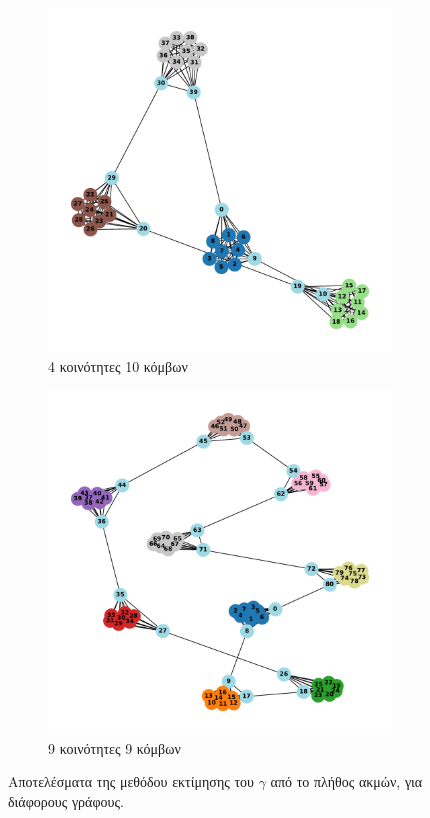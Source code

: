 \documentclass[10pt, letterpaper]{article}
\begin{document}
\begin{figure}
  \begin{subfigure}{0.5\textwidth}
    \centering
    \includegraphics[width=0.8\linewidth]{AUTO4,10.pdf}
    \caption{4 κοινότητες 10 κόμβων}
    \label{}
  \end{subfigure}
  \begin{subfigure}{0.5\textwidth}
    \centering
    \includegraphics[width=0.8\linewidth]{AUTO9,9.pdf}
    \caption{9 κοινότητες 9 κόμβων}
    \label{}
  \end{subfigure}


  \caption{Αποτελέσματα της μεθόδου εκτίμησης του $\gamma$
  από το πλήθος ακμών, για διάφορους γράφους.}
  \label{edgeresults}
\end{figure}
\end{document}
